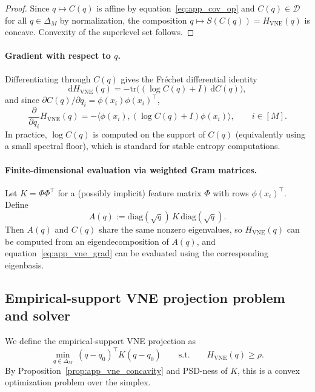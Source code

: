 \documentclass{article}
\theoremstyle{plain}
\theoremstyle{definition}
\def\eqref#1{equation~\ref{#1}}
\begin{document}
\begin{appendices}
\begin{proof}
Since $q\mapsto C(q)$ is affine by \eqref{eq:app_cov_op} and $C(q)\in\mathcal{D}$ for all $q\in\Delta_M$ by normalization, the composition $q\mapsto S(C(q))=H_{\mathrm{VNE}}(q)$ is concave. Convexity of the superlevel set follows.
\end{proof}

\paragraph{Gradient with respect to $q$.}
Differentiating through $C(q)$ gives the Fr\'echet differential identity
\begin{equation}\label{eq:app_vne_diff}
\mathrm{d}H_{\mathrm{VNE}}(q)
=
-\mathrm{tr}\!\bigl((\log C(q)+I)\,\mathrm{d}C(q)\bigr),
\end{equation}
and since $\partial C(q)/\partial q_i=\phi(x_i)\phi(x_i)^\top$,
\begin{equation}\label{eq:app_vne_grad}
\frac{\partial}{\partial q_i}H_{\mathrm{VNE}}(q)
=
-\bigl\langle \phi(x_i),(\log C(q)+I)\phi(x_i)\bigr\rangle,
\qquad i\in[M].
\end{equation}
In practice, $\log C(q)$ is computed on the support of $C(q)$ (equivalently using a small spectral floor), which is standard for stable entropy computations.

\paragraph{Finite-dimensional evaluation via weighted Gram matrices.}
Let $K=\Phi\Phi^\top$ for a (possibly implicit) feature matrix $\Phi$ with rows $\phi(x_i)^\top$. Define
\begin{equation}\label{eq:app_Aq}
A(q):=\mathrm{diag}(\sqrt{q})\,K\,\mathrm{diag}(\sqrt{q}).
\end{equation}
Then $A(q)$ and $C(q)$ share the same nonzero eigenvalues, so $H_{\mathrm{VNE}}(q)$ can be computed from an eigendecomposition of $A(q)$, and \eqref{eq:app_vne_grad} can be evaluated using the corresponding eigenbasis.

\subsection{Empirical-support VNE projection problem and solver}

We define the empirical-support VNE projection as
\begin{equation}\label{eq:app_vne_proj}
\min_{q\in\Delta_M}\ (q-q_0)^\top K (q-q_0)
\qquad\text{s.t.}\qquad
H_{\mathrm{VNE}}(q)\ge \rho.
\end{equation}
By Proposition~\ref{prop:app_vne_concavity} and PSD-ness of $K$, this is a convex optimization problem over the simplex.


\end{appendices}
\end{document}
